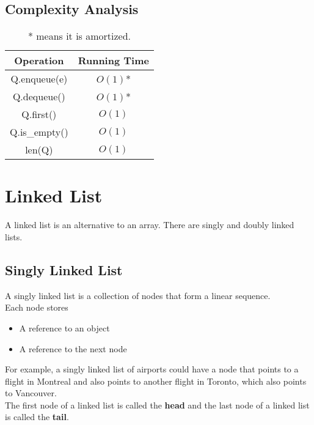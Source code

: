 \documentclass[]{article}
\begin{document}
\subsection{Complexity Analysis}\bigbreak

\begin{center}
	\begin{table}[h!]\centering
		\begin{tabular}{|c|c|}
			\hline
			Operation   & Running Time\\\hline
			Q.enqueue(e) & $O(1)$*\\
			Q.dequeue() & $O(1)$*\\
			Q.first() & $O(1)$\\
			Q.is\_empty() & $O(1)$\\
			len(Q) & $O(1)$\\\hline
		\end{tabular}
		\caption*{* means it is amortized.}
	\end{table}
\end{center}\bigbreak


\section{Linked List}\bigbreak\bigbreak

A linked list is an alternative to an array. There are singly and doubly linked lists.\\

\subsection{Singly Linked List}\bigbreak

A singly linked list is a collection of nodes that form a linear sequence. \\

Each node stores

\begin{itemize}
	\item A reference to an object
	\item A reference to the next node
\end{itemize}\bigbreak

For example, a singly linked list of airports could have a node that points to a flight in Montreal and also points to another flight in Toronto, which also points to Vancouver. \\

The first node of a linked list is called the \textbf{head} and the last node of a linked list is called the \textbf{tail}.\\
\end{document}
